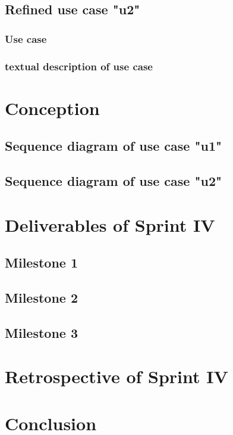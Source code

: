 \subsection{Refined use case "u2"}
\subsubsection{Use case}
\subsubsection{textual description of use case}

\section{Conception}
\subsection{Sequence diagram of use case "u1"}
\subsection{Sequence diagram of use case "u2"}

\section{Deliverables of Sprint IV}
\subsection{Milestone 1}
\subsection{Milestone 2}
\subsection{Milestone 3}
\section{Retrospective of Sprint IV}
\section{Conclusion}